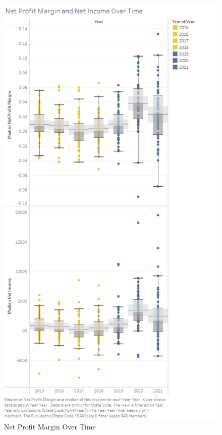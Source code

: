 \documentclass{article}
\theoremstyle{mytheoremstyle}
\theoremstyle{mytheoremstyle}
\theoremstyle{myproblemstyle}
\begin{document}
\begin{figure}[htbp]
\centering
\begin{minipage}{0.45\linewidth}
    \includegraphics[width=\linewidth]{Images/COVID Net Profit Margin.png}
    \caption{Net Profit Margin Over Time}
    \label{fig:NetProfitMargin}
\end{minipage}

\end{figure}
\end{document}
